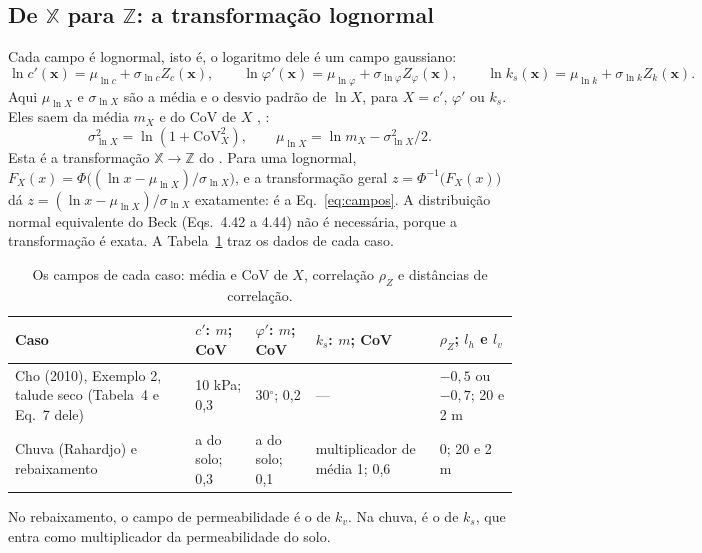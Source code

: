 \documentclass[11pt,a4paper]{article}
\newcommand{\X}{\mathbb{X}}
\newcommand{\Z}{\mathbb{Z}}
\begin{document}
\subsection{De $\X$ para $\Z$: a transformação lognormal}\label{sec:xz}
Cada campo é lognormal, isto é, o logaritmo dele é um campo gaussiano:
\begin{equation}
  \ln c'(\bm x) = \mu_{\ln c} + \sigma_{\ln c} Z_c(\bm x), \qquad
  \ln\varphi'(\bm x) = \mu_{\ln\varphi} + \sigma_{\ln\varphi} Z_\varphi(\bm x), \qquad
  \ln k_s(\bm x) = \mu_{\ln k} + \sigma_{\ln k} Z_k(\bm x).
  \label{eq:campos}
\end{equation}
Aqui $\mu_{\ln X}$ e $\sigma_{\ln X}$ são a média e o desvio padrão de $\ln X$, para $X = c'$, $\varphi'$ ou $k_s$. Eles
saem da média $m_X$ e do CoV de $X$ \citep[Eqs.~13 e 14]{cho2010}, \citep[Eq.~66]{ceron2025}:
\begin{equation}
  \sigma_{\ln X}^2 = \ln(1 + \mathrm{CoV}_X^2), \qquad \mu_{\ln X} = \ln m_X - \sigma_{\ln X}^2/2.
  \label{eq:lognormal}
\end{equation}
Esta é a transformação $\X \to \Z$ do \citet{beck2014}. Para uma lognormal,
$F_X(x) = \Phi\big((\ln x - \mu_{\ln X})/\sigma_{\ln X}\big)$, e a transformação geral $z = \Phi^{-1}\big(F_X(x)\big)$
\citep[Eq.~4.47]{beck2014} dá $z = (\ln x - \mu_{\ln X})/\sigma_{\ln X}$ exatamente: é a Eq.~\eqref{eq:campos}. A distribuição normal equivalente do Beck (Eqs.~4.42 a 4.44) não é necessária,
porque a transformação é exata. A Tabela~\ref{tab:dados} traz os dados de cada caso.

\begin{table}[H]\centering\small
\caption{Os campos de cada caso: média e CoV de $X$, correlação $\rho_Z$ e distâncias de correlação.}\label{tab:dados}
\begin{tabular}{p{}p{}p{}p{}p{}}
\toprule
Caso & $c'$: $m$; CoV & $\varphi'$: $m$; CoV & $k_s$: $m$; CoV & $\rho_Z$; $l_h$ e $l_v$ \\
\midrule
Cho (2010), Exemplo 2, talude seco (Tabela~4 e Eq.~7 dele) & 10 kPa; 0,3 & 30$^\circ$; 0,2 & --- &
  $-0{,}5$ ou $-0{,}7$; 20 e 2 m \\
Chuva (Rahardjo) e rebaixamento \citep[Tabela~2]{ceron2025} & a do solo; 0,3 & a do solo; 0,1 &
  multiplicador de média 1; 0,6 & 0; 20 e 2 m \\
\bottomrule
\end{tabular}
\end{table}
No rebaixamento, o campo de permeabilidade é o de $k_v$. Na chuva, é o de $k_s$, que entra como multiplicador da
permeabilidade do solo.
\end{document}
